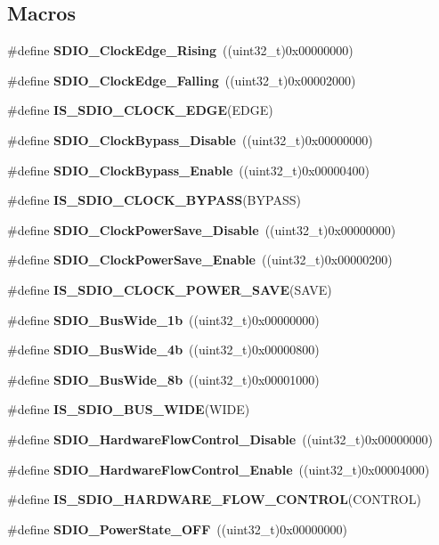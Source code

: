 \subsection*{Macros}
\begin{DoxyCompactItemize}
\item 
\#define \textbf{ S\+D\+I\+O\+\_\+\+Clock\+Edge\+\_\+\+Rising}~((uint32\+\_\+t)0x00000000)
\item 
\#define \textbf{ S\+D\+I\+O\+\_\+\+Clock\+Edge\+\_\+\+Falling}~((uint32\+\_\+t)0x00002000)
\item 
\#define \textbf{ I\+S\+\_\+\+S\+D\+I\+O\+\_\+\+C\+L\+O\+C\+K\+\_\+\+E\+D\+GE}(E\+D\+GE)
\item 
\#define \textbf{ S\+D\+I\+O\+\_\+\+Clock\+Bypass\+\_\+\+Disable}~((uint32\+\_\+t)0x00000000)
\item 
\#define \textbf{ S\+D\+I\+O\+\_\+\+Clock\+Bypass\+\_\+\+Enable}~((uint32\+\_\+t)0x00000400)
\item 
\#define \textbf{ I\+S\+\_\+\+S\+D\+I\+O\+\_\+\+C\+L\+O\+C\+K\+\_\+\+B\+Y\+P\+A\+SS}(B\+Y\+P\+A\+SS)
\item 
\#define \textbf{ S\+D\+I\+O\+\_\+\+Clock\+Power\+Save\+\_\+\+Disable}~((uint32\+\_\+t)0x00000000)
\item 
\#define \textbf{ S\+D\+I\+O\+\_\+\+Clock\+Power\+Save\+\_\+\+Enable}~((uint32\+\_\+t)0x00000200)
\item 
\#define \textbf{ I\+S\+\_\+\+S\+D\+I\+O\+\_\+\+C\+L\+O\+C\+K\+\_\+\+P\+O\+W\+E\+R\+\_\+\+S\+A\+VE}(S\+A\+VE)
\item 
\#define \textbf{ S\+D\+I\+O\+\_\+\+Bus\+Wide\+\_\+1b}~((uint32\+\_\+t)0x00000000)
\item 
\#define \textbf{ S\+D\+I\+O\+\_\+\+Bus\+Wide\+\_\+4b}~((uint32\+\_\+t)0x00000800)
\item 
\#define \textbf{ S\+D\+I\+O\+\_\+\+Bus\+Wide\+\_\+8b}~((uint32\+\_\+t)0x00001000)
\item 
\#define \textbf{ I\+S\+\_\+\+S\+D\+I\+O\+\_\+\+B\+U\+S\+\_\+\+W\+I\+DE}(W\+I\+DE)
\item 
\#define \textbf{ S\+D\+I\+O\+\_\+\+Hardware\+Flow\+Control\+\_\+\+Disable}~((uint32\+\_\+t)0x00000000)
\item 
\#define \textbf{ S\+D\+I\+O\+\_\+\+Hardware\+Flow\+Control\+\_\+\+Enable}~((uint32\+\_\+t)0x00004000)
\item 
\#define \textbf{ I\+S\+\_\+\+S\+D\+I\+O\+\_\+\+H\+A\+R\+D\+W\+A\+R\+E\+\_\+\+F\+L\+O\+W\+\_\+\+C\+O\+N\+T\+R\+OL}(C\+O\+N\+T\+R\+OL)
\item 
\#define \textbf{ S\+D\+I\+O\+\_\+\+Power\+State\+\_\+\+O\+FF}~((uint32\+\_\+t)0x00000000)

\end{DoxyCompactItemize}
